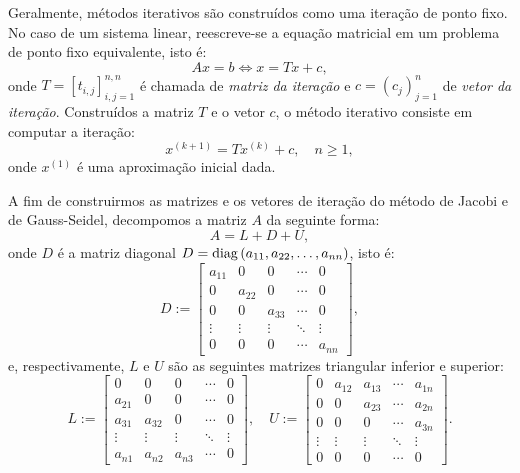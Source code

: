 Geralmente, métodos iterativos são construídos como uma iteração de ponto fixo. No caso de um sistema linear, reescreve-se a equação matricial em um problema de ponto fixo equivalente, isto é:
\begin{equation}
  Ax = b \Leftrightarrow x = Tx + c,
\end{equation}
onde $T = [t_{i,j}]_{i,j=1}^{n,n}$ é chamada de \emph{matriz da iteração} e $c = (c_j)_{j=1}^n$ de \emph{vetor da iteração}. Construídos a matriz $T$ e o vetor $c$, o método iterativo consiste em computar a iteração:
\begin{equation}
  x^{(k+1)} = Tx^{(k)} + c,\quad n\geq 1,
\end{equation}
onde $x^{(1)}$ é uma aproximação inicial dada.

A fim de construirmos as matrizes e os vetores de iteração do método de Jacobi e de Gauss-Seidel, decompomos a matriz $A$ da seguinte forma:
\begin{equation}
  A = L + D + U,
\end{equation}
onde $D$ é a matriz diagonal $D = \operatorname{diag}\,(a_{11}, a_{22}, \ldots, a_{nn})$, isto é:
\begin{equation}
  D := \begin{bmatrix}
    a_{11} & 0 & 0 & \cdots & 0\\
    0 & a_{22} & 0 & \cdots & 0\\
    0 & 0 & a_{33} & \cdots & 0\\
    \vdots & \vdots & \vdots & \ddots & \vdots\\
    0 & 0 & 0 & \cdots & a_{nn}
  \end{bmatrix},
\end{equation}
e, respectivamente, $L$ e $U$ são as seguintes matrizes triangular inferior e superior:
\begin{equation}
  L := \begin{bmatrix}
    0 & 0 & 0 & \cdots & 0\\
    a_{21} & 0 & 0 & \cdots & 0\\
    a_{31} & a_{32} & 0 &\cdots & 0\\
    \vdots & \vdots & \vdots & \ddots & \vdots\\
    a_{n1} & a_{n2} & a_{n3} & \cdots & 0
  \end{bmatrix},\quad
  U := \begin{bmatrix}
    0 & a_{12} & a_{13} & \cdots & a_{1n}\\
    0 & 0 & a_{23} & \cdots & a_{2n}\\
    0 & 0 & 0 & \cdots & a_{3n}\\
    \vdots & \vdots & \vdots & \ddots & \vdots\\
    0 & 0 & 0 & \cdots & 0
  \end{bmatrix}.
\end{equation}

